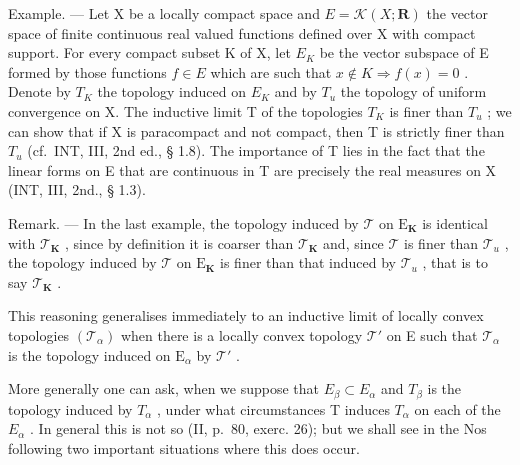 Example. --- Let X be a locally compact space and \(E = \mathcal{K}(X; \mathbf{R})\) the vector space of finite continuous real valued functions defined over X with compact support. For every compact subset K of X, let \(E_{K}\) be the vector subspace of E formed by those functions \(f \in E\) which are such that \(x \notin K \Rightarrow f(x) = 0\) . Denote by \(T_{K}\) the topology induced on \(E_{K}\) and by \(T_{u}\) the topology of uniform convergence on X. The inductive limit T of the topologies \(T_{K}\) is finer than \(T_{u}\) ; we can show that if X is paracompact and not compact, then T is strictly finer than \(T_{u}\) (cf.~INT, III, 2nd ed., § 1.8). The importance of T lies in the fact that the linear forms on E that are continuous in T are precisely the real measures on X (INT, III, 2nd., § 1.3).

Remark. --- In the last example, the topology induced by \(\mathcal{T}\) on \(\mathrm{E}_{\mathbf{K}}\) is identical with \(\mathcal{T}_{\mathbf{K}}\) , since by definition it is coarser than \(\mathcal{T}_{\mathbf{K}}\) and, since \(\mathcal{T}\) is finer than \(\mathcal{T}_{u}\) , the topology induced by \(\mathcal{T}\) on \(\mathrm{E}_{\mathbf{K}}\) is finer than that induced by \(\mathcal{T}_{u}\) , that is to say \(\mathcal{T}_{\mathbf{K}}\) .

This reasoning generalises immediately to an inductive limit of locally convex topologies \((\mathcal{T}_{\alpha})\) when there is a locally convex topology \(\mathcal{T}'\) on E such that \(\mathcal{T}_{\alpha}\) is the topology induced on \(\mathrm{E}_{\alpha}\) by \(\mathcal{T}'\) .

More generally one can ask, when we suppose that \(E_{\beta} \subset E_{\alpha}\) and \(T_{\beta}\) is the topology induced by \(T_{\alpha}\) , under what circumstances T induces \(T_{\alpha}\) on each of the \(E_{\alpha}\) . In general this is not so (II, p.~80, exerc. 26); but we shall see in the Nos following two important situations where this does occur.

